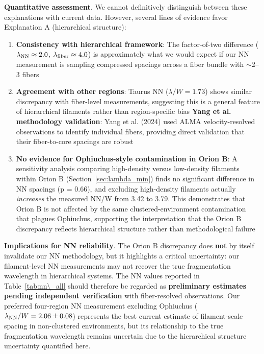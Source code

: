 \documentclass[twoside,twocolumn]{mnras}
\begin{document}
\textbf{Quantitative assessment}. We cannot definitively distinguish between these explanations with current data. However, several lines of evidence favor Explanation A (hierarchical structure):
\begin{enumerate}
    \item \textbf{Consistency with hierarchical framework}: The factor-of-two difference ($\lambda_{\rm NN} \approx 2.0$, $\lambda_{\rm fiber} \approx 4.0$) is approximately what we would expect if our NN measurement is sampling compressed spacings across a fiber bundle with $\sim$2--3 fibers
    \item \textbf{Agreement with other regions}: Taurus NN ($\lambda/W = 1.73$) shows similar discrepancy with fiber-level measurements, suggesting this is a general feature of hierarchical filaments rather than region-specific bias
    \textbf{Yang et al. methodology validation}: Yang et al. (2024) used ALMA velocity-resolved observations to identify individual fibers, providing direct validation that their fiber-to-core spacings are robust
    \item \textbf{No evidence for Ophiuchus-style contamination in Orion B}: A sensitivity analysis comparing high-density versus low-density filaments within Orion B (Section~\ref{sec:lambda_min}) finds no significant difference in NN spacings (p = 0.66), and excluding high-density filaments actually \textit{increases} the measured NN/W from 3.42 to 3.79. This demonstrates that Orion B is not affected by the same clustered-environment contamination that plagues Ophiuchus, supporting the interpretation that the Orion B discrepancy reflects hierarchical structure rather than methodological failure
\end{enumerate}

\textbf{Implications for NN reliability}. The Orion B discrepancy does \textbf{not} by itself invalidate our NN methodology, but it highlights a critical uncertainty: our filament-level NN measurements may not recover the true fragmentation wavelength in hierarchical systems. The NN values reported in Table~\ref{tab:nn\_all} should therefore be regarded as \textbf{preliminary estimates pending independent verification} with fiber-resolved observations. Our preferred four-region NN measurement excluding Ophiuchus ($\lambda_{\rm NN}/W = 2.06 \pm 0.08$) represents the best current estimate of filament-scale spacing in non-clustered environments, but its relationship to the true fragmentation wavelength remains uncertain due to the hierarchical structure uncertainty quantified here.
\end{document}
